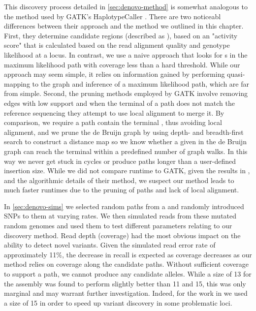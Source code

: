 This \denovo{} discovery process detailed in \autoref{sec:denovo-method} is somewhat analogous to the method used by GATK's HaplotypeCaller \cite{Poplin2018}. There are two noticeabl differences between their approach and the method we outlined in this chapter. First, they determine candidate regions (described as ), based on an "activity score" that is calculated based on the read alignment quality and genotype likelihood at a locus. In contrast, we use a naive approach that looks for \kmer{}s in the maximum likelihood path with coverage less than a hard threshold. While our approach may seem simple, it relies on information gained by performing quasi-mapping to the graph and inference of a maximum likelihood path, which are far from simple. Second, the pruning methods employed by GATK involve removing edges with low support and when the terminal \kmer{} of a path does not match the reference sequencing they attempt to use local alignment to merge it. By comparison, we require a path contain the terminal \kmer{}, thus avoiding local alignment, and we prune the de Bruijn graph by using depth- and breadth-first search to construct a distance map so we know whether a given \kmer{} in the de Bruijn graph can reach the terminal \kmer{} within a predefined number of graph walks. In this way we never get stuck in cycles or produce paths longer than a user-defined insertion size. While we did not compare \pandora{} runtime to GATK, given the results in \cite{Poplin2018}, and the algorithmic details of their method, we suspect our method leads to much faster runtimes due to the pruning of paths and lack of local alignment.

In \autoref{sec:denovo-sims} we selected random paths from a \panrg{} and randomly introduced SNPs to them at varying rates. We then simulated \ont{} reads from these mutated random genomes and used them to test different parameters relating to our \denovo{} discovery method. Read depth (coverage) had the most obvious impact on the ability to detect novel variants. Given the simulated \ont{} read error rate of approximately 11\%, the decrease in recall is expected as coverage decreases as our method relies on \kmer{} coverage along the candidate paths. Without sufficient \kmer{} coverage to support a path, we cannot produce any candidate alleles. While a \kmer{} size of 13 for the \denovo{} assembly was found to perform slightly better than 11 and 15, this was only marginal and may warrant further investigation. Indeed, for the work in \cite{pandora} we used a \denovo{} \kmer{} size of 15 in order to speed up variant discovery in some problematic loci.

